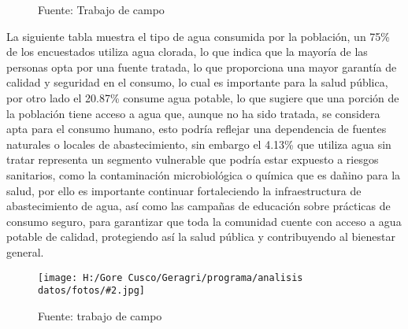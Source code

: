 \documentclass{article}\usepackage[]{graphicx}\usepackage[table]{xcolor}
\makeatletter
\newenvironment{kframe}{%
 \def\at@end@of@kframe{}%
 \ifinner\ifhmode%
  \def\at@end@of@kframe{\end{minipage}}%
  \begin{minipage}{\columnwidth}%
 \fi\fi%
 \def\FrameCommand##1{\hskip\@totalleftmargin \hskip-\fboxsep
 \colorbox{shadecolor}{##1}\hskip-\fboxsep
     \hskip-\linewidth \hskip-\@totalleftmargin \hskip\columnwidth}%
 \MakeFramed {\advance\hsize-\width
   \@totalleftmargin\z@ \linewidth\hsize
   \@setminipage}}%
 {\par\unskip\endMakeFramed%
 \at@end@of@kframe}
\newenvironment{knitrout}{}{} %
\newenvironment{fotos}[2]
{\begin{figure}[H]
	\centering
	\caption{#1}
	\texttt{[image: H:/Gore Cusco/Geragri/programa/analisis datos/fotos/\#2.jpg]}
	\caption*{Fuente: trabajo de campo}}
{\end{figure}}
\makeatother
\begin{document}
\begin{figure}[H]
  \centering
  \caption{Tipo de agua que consume}
\begin{knitrout}
\color{fgcolor}\begin{kframe}


{\ttfamily\noindent\bfseries{}}

{\ttfamily\noindent{}}

{\ttfamily\noindent\bfseries{}}

{\ttfamily\noindent\bfseries\color{errorcolor}{\#\# Error: objeto 'datos' no encontrado}}

{\ttfamily\noindent\bfseries\color{errorcolor}{\#\# Error: objeto 'datos' no encontrado}}

{\ttfamily\noindent\bfseries\color{errorcolor}{\#\# Error: objeto 'datos' no encontrado}}

{\ttfamily\noindent\bfseries\color{errorcolor}{\#\# Error: objeto 'graph1' no encontrado}}\end{kframe}
\end{knitrout}
  \caption*{Fuente: Trabajo de campo}
\end{figure}
La siguiente tabla muestra el tipo de agua consumida por la población, un 75\% de los encuestados utiliza agua clorada, lo que indica que la mayoría de las personas opta por una fuente tratada, lo que proporciona una mayor garantía de calidad y seguridad en el consumo, lo cual es importante  para la salud pública, por otro lado el 20.87\% consume agua potable, lo que sugiere que una porción de la población tiene acceso a agua que, aunque no ha sido tratada, se considera apta para el consumo humano, esto podría reflejar una dependencia de fuentes naturales o locales de abastecimiento, sin embargo el 4.13\% que utiliza agua sin tratar representa un segmento vulnerable que podría estar expuesto a riesgos sanitarios, como la contaminación microbiológica o química que es dañino para la salud, por ello es importante continuar fortaleciendo la infraestructura de abastecimiento de agua, así como las campañas de educación sobre prácticas de consumo seguro, para garantizar que toda la comunidad cuente con acceso a agua potable de calidad, protegiendo así la salud pública y contribuyendo al bienestar general.
\begin{fotos}
{sensibilizacion a la poblacion}{8}
\end{fotos}
\end{document}
